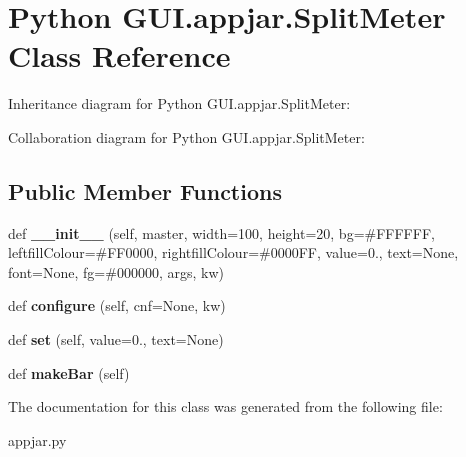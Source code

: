 \hypertarget{class_python_01_g_u_i_1_1appjar_1_1_split_meter}{}\section{Python G\+U\+I.\+appjar.\+Split\+Meter Class Reference}
\label{class_python_01_g_u_i_1_1appjar_1_1_split_meter}


Inheritance diagram for Python G\+U\+I.\+appjar.\+Split\+Meter\+:


Collaboration diagram for Python G\+U\+I.\+appjar.\+Split\+Meter\+:
\subsection*{Public Member Functions}
\begin{DoxyCompactItemize}
\item 
\mbox{\label{class_python_01_g_u_i_1_1appjar_1_1_split_meter_a636804976a47512e51c6d9113ce8020f}} 
def {\bfseries \+\_\+\+\_\+init\+\_\+\+\_\+} (self, master, width=100, height=20, bg=\textquotesingle{}\#F\+F\+F\+F\+FF\textquotesingle{}, leftfill\+Colour=\textquotesingle{}\#F\+F0000\textquotesingle{}, rightfill\+Colour=\textquotesingle{}\#0000\+F\+F\textquotesingle{}, value=0., text=\+None, font=\+None, fg=\textquotesingle{}\#000000\textquotesingle{}, args, kw)
\item 
\mbox{\label{class_python_01_g_u_i_1_1appjar_1_1_split_meter_aa7e072b44c331375454d6328731b9bdd}} 
def {\bfseries configure} (self, cnf=None, kw)
\item 
\mbox{\label{class_python_01_g_u_i_1_1appjar_1_1_split_meter_a733180d4c146660657d23a4179cf00ae}} 
def {\bfseries set} (self, value=0., text=None)
\item 
\mbox{\label{class_python_01_g_u_i_1_1appjar_1_1_split_meter_acd271d74c98cf4f86bcfe6e29a8f8304}} 
def {\bfseries make\+Bar} (self)
\end{DoxyCompactItemize}


The documentation for this class was generated from the following file\+:\begin{DoxyCompactItemize}
\item 
appjar.\+py\end{DoxyCompactItemize}
